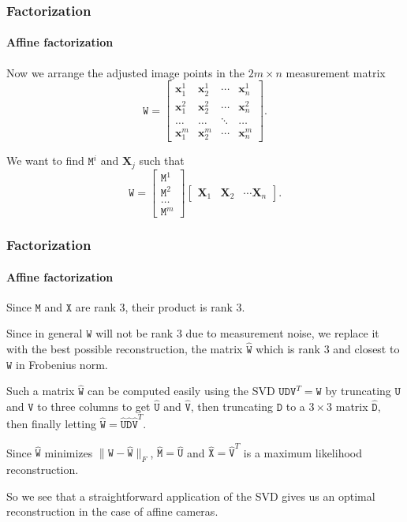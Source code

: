 \documentclass[aspectratio=169]{beamer}
\renewcommand{\vec}[1]{\boldsymbol{#1}}
\newcommand{\mat}[1]{\mathtt{#1}}
\begin{document}
\begin{frame}
\frametitle{Factorization}
\framesubtitle{Affine factorization}

Now we arrange the adjusted image points in the $2m\times n$
\alert{measurement matrix}
\begin{equation*}
\mat{W}=\begin{bmatrix}
\vec{x}_1^1 & \vec{x}_2^1 & \cdots & \vec{x}_n^1 \\
\vec{x}_1^2 & \vec{x}_2^2 & \cdots & \vec{x}_n^2 \\
\hdots & \hdots & \ddots & \hdots \\
\vec{x}_1^m & \vec{x}_2^m & \cdots & \vec{x}_n^m
\end{bmatrix}.
\end{equation*}

\medskip

We want to find $\mat{M}^i$ and $\vec{X}_j$ such that
\begin{equation*}
\mat{W} = \begin{bmatrix} \mat{M}^1 \\ \mat{M}^2 \\ \hdots \\
\mat{M}^m \end{bmatrix} \begin{bmatrix} \vec{X}_1 & \vec{X}_2 & \cdots
\vec{X}_n \end{bmatrix}.
\end{equation*}

\end{frame}

\begin{frame}
\frametitle{Factorization}
\framesubtitle{Affine factorization}

Since $\mat{M}$ and $\mat{X}$ are rank 3, their product is rank 3.

\medskip

Since in general $\mat{W}$ will not be rank 3 due to measurement
noise, we replace it with the best possible reconstruction, the matrix
$\hat{\mat{W}}$ which is rank 3 and closest to $\mat{W}$ in Frobenius
norm.

\medskip

Such a matrix $\hat{\mat{W}}$ can be computed easily using the SVD
$\mat{U}\mat{D}\mat{V}^T=\mat{W}$ by truncating $\mat{U}$ and
$\mat{V}$ to three columns to get $\hat{\mat{U}}$ and $\hat{\mat{V}}$,
then truncating $\mat{D}$ to a $3\times 3$ matrix $\hat{\mat{D}}$,
then finally letting
$\hat{\mat{W}}=\hat{\mat{U}}\hat{\mat{D}}\hat{\mat{V}}^T$.

\medskip

Since $\hat{\mat{W}}$ minimizes $\|\mat{W}-\hat{\mat{W}}\|_F$,
$\hat{\mat{M}}=\hat{\mat{U}}$ and $\hat{\mat{X}}=\hat{\mat{V}}^T$ is a
maximum likelihood reconstruction.

\medskip

So we see that a straightforward application of the SVD gives us an
\alert{optimal reconstruction} in the case of \alert{affine cameras}.

\end{frame}
\end{document}
